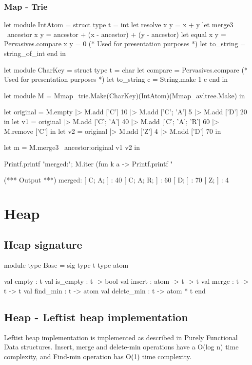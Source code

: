\documentclass{article}
\begin{document}
\subsubsection{Map - Trie}
\begin{longlisting}
let module IntAtom = struct
  type t = int
  let resolve x y = x + y
  let merge3 ~ancestor x y = ancestor + (x - ancestor) + (y - ancestor)
  let equal x y = Pervasives.compare x y = 0 
  (* Used for presentation purposes *)
  let to_string = string_of_int
end in

let module CharKey = struct
  type t = char
  let compare = Pervasives.compare
  (* Used for presentation purposes *)
  let to_string c = String.make 1 c
end in

let module M = Mmap_trie.Make(CharKey)(IntAtom)(Mmap_avltree.Make) in

let original = M.empty |> M.add ['C'] 10 |> M.add ['C'; 'A'] 5 |> M.add ['D'] 20 in
let v1 = original |> M.add ['C'; 'A'] 40 |> M.add ['C'; 'A'; 'R'] 60 |> M.remove ['C'] in
let v2 = original |> M.add ['Z'] 4 |> M.add ['D'] 70 in

let m = M.merge3 ~ancestor:original v1 v2 in

Printf.printf "merged:\n";
M.iter (fun k a -> Printf.printf "%

(*** Output ***)
merged:
[ C; A; ] : 40
[ C; A; R; ] : 60
[ D; ] : 70
[ Z; ] : 4
\end{longlisting}

\newpage
\section{Heap}
\subsection{Heap signature}
\begin{longlisting}
module type Base = sig
  type t
  type atom

  val empty : t
  val is_empty : t -> bool
  val insert : atom -> t -> t
  val merge : t -> t -> t
  val find_min : t -> atom 
  val delete_min : t -> atom * t
end
\end{longlisting}

\subsection{Heap - Leftist heap implementation}
Leftist heap implementation is implemented as described in Purely Functional Data structures\cite{okasaki1999purely}. 
Insert, merge and delete-min operations have a O(log n) time complexity, and Find-min operation has O(1) time complexity.
\end{document}
